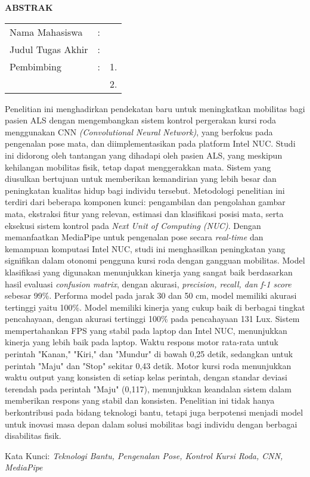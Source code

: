 \begin{center}
  \large\textbf{ABSTRAK}
\end{center}


\vspace{2ex}

\begingroup
\setlength{\tabcolsep}{0pt}

\noindent
\begin{tabularx}{\textwidth}{l >{\centering}m{2em} X}
  Nama Mahasiswa    & : & \name{}         \\

  Judul Tugas Akhir & : & \tatitle{}      \\

  Pembimbing        & : & 1. \advisor{}   \\
                    &   & 2. \coadvisor{} \\
\end{tabularx}
\endgroup

Penelitian ini menghadirkan pendekatan baru untuk meningkatkan mobilitas bagi pasien ALS dengan mengembangkan sistem kontrol pergerakan kursi roda menggunakan CNN \emph{(Convolutional Neural Network)}, yang berfokus pada pengenalan pose mata, dan diimplementasikan pada platform Intel NUC. Studi ini didorong oleh tantangan yang dihadapi oleh pasien ALS, yang meskipun kehilangan mobilitas fisik, tetap dapat menggerakkan mata. Sistem yang diusulkan bertujuan untuk memberikan kemandirian yang lebih besar dan peningkatan kualitas hidup bagi individu tersebut. Metodologi penelitian ini terdiri dari beberapa komponen kunci: pengambilan dan pengolahan gambar mata, ekstraksi fitur yang relevan, estimasi dan klasifikasi posisi mata, serta eksekusi sistem kontrol pada \textit{Next Unit of Computing (NUC)}. Dengan memanfaatkan MediaPipe untuk pengenalan pose secara \emph{real-time} dan kemampuan komputasi Intel NUC, studi ini menghasilkan peningkatan yang signifikan dalam otonomi pengguna kursi roda dengan gangguan mobilitas.  Model klasifikasi yang digunakan menunjukkan kinerja yang sangat baik berdasarkan hasil evaluasi \emph{confusion matrix}, dengan akurasi, \emph{precision, recall, dan f-1 score} sebesar 99\%. Performa model pada jarak 30 dan 50 cm, model memiliki akurasi tertinggi yaitu 100\%. Model memiliki kinerja yang cukup baik di berbagai tingkat pencahayaan, dengan akurasi tertinggi 100\% pada pencahayaan 131 Lux. Sistem mempertahankan FPS yang stabil pada laptop dan Intel NUC, menunjukkan kinerja yang lebih baik pada laptop. Waktu respons motor rata-rata untuk perintah "Kanan," "Kiri," dan "Mundur" di bawah 0,25 detik, sedangkan untuk perintah "Maju" dan "Stop" sekitar 0,43 detik. Motor kursi roda menunjukkan waktu output yang konsisten di setiap kelas perintah, dengan standar deviasi terendah pada perintah "Maju" (0,117), menunjukkan keandalan sistem dalam memberikan respons yang stabil dan konsisten. Penelitian ini tidak hanya berkontribusi pada bidang teknologi bantu, tetapi juga berpotensi menjadi model untuk inovasi masa depan dalam solusi mobilitas bagi individu dengan berbagai disabilitas fisik.

Kata Kunci: \emph{Teknologi Bantu, Pengenalan Pose, Kontrol Kursi Roda, CNN, MediaPipe}